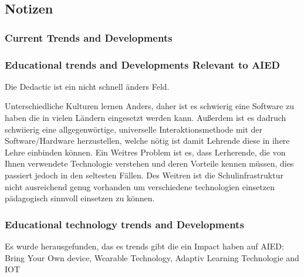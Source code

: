 \begin{comment}
Die Gesellschaft für Informatiker hat Herausforderungen für den Bereich Informatik definiert. Diese gelten selbstverständlich auch für \ac{AIED} Systeme.
Bei den Herausforderungen handelt es sich um die Bewahrung und Archivierung des digitalen Kulturerbes, ermöglichung eines sicheren, privaten, freien und vertrauensvollen Nutzung des Internets,
Bewältigung von Risikin in Globalen IT Infrastrukturen, Entwicklung von Interaktionsmöglichkeiten, die es allen Menschen ermöglicht von IT Systemen zu profitieren, sowie die Gewährleitungs das IT Systeme dauerhaft verfügbar sind.
weitere 
\end{comment}
    
\subsection{Notizen}

\subsubsection*{Current Trends and Developments}

\subsubsection{Educational trends and Developments Relevant to AIED}
Die Dedactic ist ein nicht schnell änders Feld.

Unterschiedliche Kulturen lernen Anders, daher ist es schwierig eine Software zu haben die in vielen Ländern eingesetzt werden kann.
Außerdem ist es dadruch schwiierig eine allgegenwörtige, universelle Interaktionsmethode mit der Software/Hardware herzustellen,
welche nötig ist damit Lehrende diese in ihere Lehre einbinden können. 
Ein Weitres Problem ist es, dass Lerherende, die von Ihnen verwendete Technologie verstehen und deren Vorteile kennen müssen,
dies passiert jedoch in den seltesten Fällen. Des Weitren ist die Schulinfrastruktur nicht ausreichend genug vorhanden um verschiedene technologien einsetzen pädagogisch sinnvoll einsetzen zu können.


\subsubsection{Educational technology trends and Developments}
Es wurde herausgefunden, das es trends gibt die ein Impact haben auf AIED: Bring Your Own device, Wearable Technology, Adaptiv Learning Technologie and IOT

